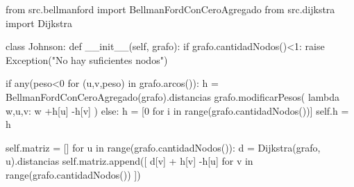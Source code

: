 \documentclass[../tp2_grupo404.tex]{subfiles}
\begin{document}
\begin{alternate}[breaklines=true,numbers=left,xleftmargin=5mm]
    from src.bellmanford import BellmanFordConCeroAgregado
    from src.dijkstra import Dijkstra
    
    class Johnson:
        def __init__(self, grafo):
            if grafo.cantidadNodos()<1:
                raise Exception("No hay suficientes nodos")
    
            if any(peso<0 for (u,v,peso) in grafo.arcos()):
                h = BellmanFordConCeroAgregado(grafo).distancias
                grafo.modificarPesos( lambda w,u,v: w +h[u] -h[v] )
            else:
                h = [0 for i in range(grafo.cantidadNodos())]
            self.h = h
            
            self.matriz = []
            for u in range(grafo.cantidadNodos()):
                d = Dijkstra(grafo, u).distancias
                self.matriz.append([ d[v] + h[v] -h[u] for v in range(grafo.cantidadNodos()) ])
\end{alternate}

\end{document}

